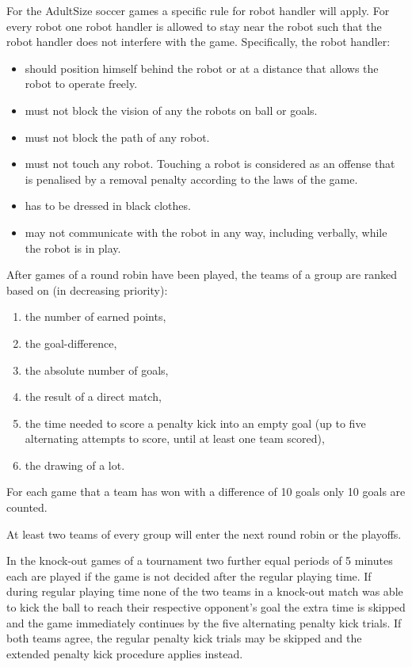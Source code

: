 \bigskip

For the AdultSize soccer games a specific rule for robot handler will apply. For every robot one robot handler is allowed to stay near the robot such that the robot handler does not interfere with the game. Specifically, the robot handler:
\begin{itemize}
\item should position himself behind the robot or at a distance that allows the robot to operate freely.
\item must not block the vision of any the robots on ball or goals.
\item must not block the path of any robot.
\item must not touch any robot. Touching a robot is considered as an offense that is penalised by a removal penalty according to the laws of the game.
\item has to be dressed in black clothes.
\item may not communicate with the robot in any way, including verbally, while the robot is in play.
\end{itemize}
\color{black}

\bigskip

After games of a round robin have been played, the teams of a group are ranked based on (in decreasing priority): 

\begin{enumerate}
\item the number of earned points,
\item the goal-difference,
\item the absolute number of goals,
\item the result of a direct match,
\item the time needed to score a penalty kick into an empty goal (up to five alternating attempts to score, until at least one team scored),
\item the drawing of a lot.
\end{enumerate}

\bigskip

For each game that a team has won with a difference of 10 goals only 10 goals are counted.

\bigskip

At least two teams of every group will enter the next round robin or the playoffs.

\bigskip

In the knock-out games of a tournament two further equal periods of 5 minutes each are played if the game is not decided after the regular playing time.  If during regular playing time none of the two teams in a knock-out match was able to kick the ball to reach their respective opponent's goal the extra time is skipped and the game immediately continues by the five alternating penalty kick trials. If both teams agree, the regular penalty kick trials may be skipped and the extended penalty kick procedure applies instead.

